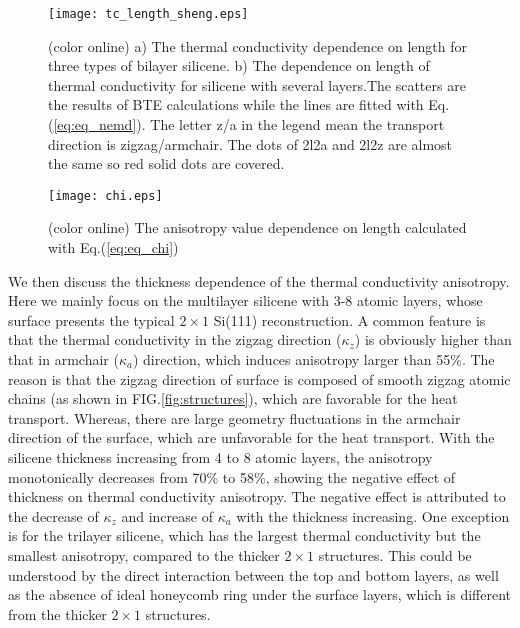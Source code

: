 \documentclass[aps,prb,twocolumn,showpacs,amsmath,amssymb]{revtex4-1}
\begin{document}
\begin{figure}[b]
 \texttt{[image: tc\_length\_sheng.eps]}
  \caption{\label{fig:tc_length_sheng} (color online) a) The thermal conductivity dependence on length for three types of bilayer silicene. b) The dependence on length of thermal conductivity for silicene with several layers.The scatters are the results of BTE calculations while the lines are fitted with Eq.(\ref{eq:eq_nemd}). The letter z/a in the legend mean the transport direction is zigzag/armchair. The dots of 2l2a and 2l2z are almost the same so red solid dots are covered. }
\end{figure}

\begin{figure}[b]
  \texttt{[image: chi.eps]}{}
  \caption{\label{fig:chi} (color online) The anisotropy value dependence on length calculated with Eq.(\ref{eq:eq_chi})}
  \end{figure}


We then discuss the thickness dependence of the thermal conductivity anisotropy. Here we mainly focus on the multilayer silicene with 3-8 atomic layers, whose surface presents the typical $2 \times 1$ Si(111) reconstruction.   A common feature is that the thermal conductivity in the zigzag direction ($\kappa_z$) is obviously  higher than that  in armchair ($\kappa_a$) direction, which induces anisotropy larger than 55\%. 
The reason is that the zigzag direction of surface is composed of smooth zigzag atomic chains (as shown in FIG.\ref{fig:structures}), which are favorable for the heat transport. Whereas,  there are large geometry fluctuations in the armchair direction of the surface, which are unfavorable for the heat transport. 
With the silicene thickness increasing from 4 to 8 atomic layers, the anisotropy monotonically decreases from 70\% to 58\%, showing the negative  effect of thickness on  thermal conductivity anisotropy. The negative  effect  is attributed to the decrease of $\kappa_z$ and increase of $\kappa_a$  with the  thickness increasing. 
One exception is for the trilayer silicene, which has the largest thermal conductivity  but the smallest  anisotropy, compared to the thicker  $2\times1$ structures.  This could be understood by the direct interaction between the top and bottom layers, as well as the absence of ideal honeycomb ring under the surface layers, which is different from the thicker $2\times 1$ structures\cite{Guo2015Structural}.
\end{document}
